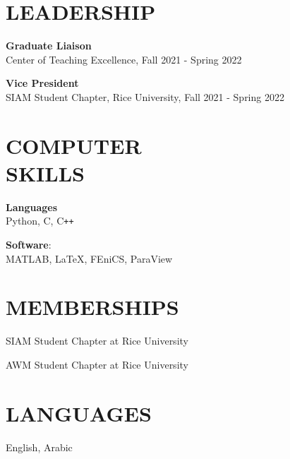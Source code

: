 \documentclass[margin]{res}
\begin{document}
\begin{resume}
\section{LEADERSHIP} \textbf{Graduate Liaison}\\
Center of Teaching Excellence, Fall 2021 - Spring 2022    
\par \textbf{Vice President} \\
SIAM Student Chapter, Rice University, Fall 2021 - Spring 2022  


\section{COMPUTER\\SKILLS}

\textbf{Languages} \\ 
Python, C, C\texttt{++} 
\par 
\textbf{Software}: \\ MATLAB, \LaTeX, FEniCS, ParaView 


\section{MEMBERSHIPS}

\par
SIAM Student Chapter at Rice University \par 

AWM Student Chapter at Rice University
\section{LANGUAGES} 
English,  Arabic 


\end{resume}
\end{document}
